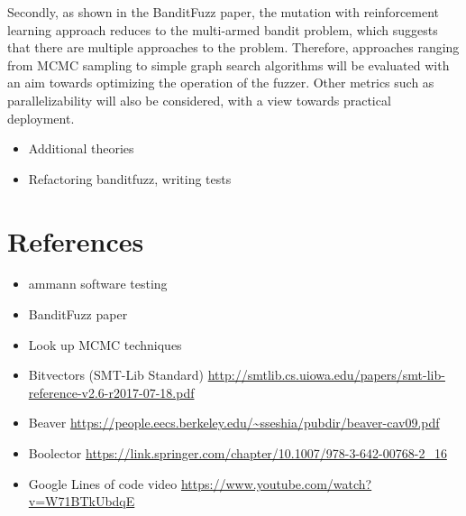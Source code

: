\documentclass[article,11pt]{article}
\begin{document}
Secondly, as shown in the BanditFuzz paper\cite{bandit}, the mutation with reinforcement learning approach reduces to the multi-armed bandit problem, which suggests that there are multiple approaches to the problem. Therefore, approaches ranging from MCMC sampling to simple graph search algorithms will be evaluated with an aim towards optimizing the operation of the fuzzer. Other metrics such as parallelizability will also be considered, with a view towards practical deployment.\\

\begin{itemize}
\item Additional theories\\
\item Refactoring banditfuzz, writing tests\\
\end{itemize}

\section*{References}
\label{sec:org73838a1}
\begin{itemize}
\item ammann software testing\\
\item BanditFuzz paper\\
\item Look up MCMC techniques\\
\item Bitvectors (SMT-Lib Standard) \url{http://smtlib.cs.uiowa.edu/papers/smt-lib-reference-v2.6-r2017-07-18.pdf}\\
\item Beaver \url{https://people.eecs.berkeley.edu/\~sseshia/pubdir/beaver-cav09.pdf}\\
\item Boolector \url{https://link.springer.com/chapter/10.1007/978-3-642-00768-2\_16}\\
\item Google Lines of code video \url{https://www.youtube.com/watch?v=W71BTkUbdqE}\\
\end{itemize}
\end{document}
